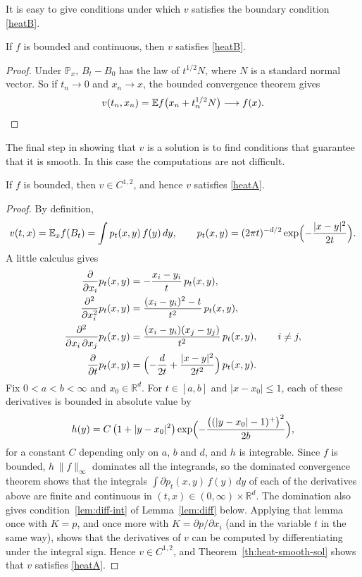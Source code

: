It is easy to give conditions under which $v$ satisfies the boundary condition
\ref{heatB}.

\begin{theorem}\label{th414}
	If $f$ is bounded and continuous, then $v$ satisfies \ref{heatB}.
\end{theorem}
\begin{proof}
	Under $\mathbb{P}_x$, $B_t - B_0$ has the law of $t^{1/2}N$, where $N$ is a
	standard normal vector. So if $t_n\to0$ and $x_n\to x$, the bounded
	convergence theorem gives
	\[
		v(t_n,x_n) = \mathbb{E} f\bigl(x_n + t_n^{1/2}N\bigr) \longrightarrow f(x). \qedhere
	\]
\end{proof}

The final step in showing that $v$ is a solution is to find conditions that
guarantee that it is smooth. In this case the computations are not difficult.

\begin{theorem}\label{th415}
	If $f$ is bounded, then $v\in C^{1,2}$, and hence $v$ satisfies \ref{heatA}.
\end{theorem}
\begin{proof}
	By definition,
	\[
		v(t,x) = \mathbb{E}_x f(B_t) = \int p_t(x,y)\,f(y)\,dy,
		\qquad
		p_t(x,y) = (2\pi t)^{-d/2}\exp\Bigl(-\frac{|x-y|^2}{2t}\Bigr).
	\]
	A little calculus gives
	\begin{align*}
		\frac{\partial}{\partial x_i}p_t(x,y)                    & = -\frac{x_i-y_i}{t}\,p_t(x,y),                                \\
		\frac{\partial^2}{\partial x_i^2}p_t(x,y)                & = \frac{(x_i-y_i)^2-t}{t^2}\,p_t(x,y),                         \\
		\frac{\partial^2}{\partial x_i\,\partial x_j}p_t(x,y)    & = \frac{(x_i-y_i)(x_j-y_j)}{t^2}\,p_t(x,y), \qquad i\neq j,    \\
		\frac{\partial}{\partial t}p_t(x,y)                      & = \Bigl(-\frac{d}{2t} + \frac{|x-y|^2}{2t^2}\Bigr)\,p_t(x,y).
	\end{align*}
	Fix $0<a<b<\infty$ and $x_0\in\mathbb{R}^d$. For $t\in[a,b]$ and
	$|x-x_0|\leqslant1$, each of these derivatives is bounded in absolute value
	by
	\[
		h(y) = C\,\bigl(1+|y-x_0|^2\bigr)\exp\Bigl(-\frac{\bigl((|y-x_0|-1)^+\bigr)^2}{2b}\Bigr),
	\]
	for a constant $C$ depending only on $a$, $b$ and $d$, and $h$ is integrable.
	Since $f$ is bounded, $h\,\|f\|_\infty$ dominates all the integrands, so
	the dominated convergence theorem shows that the integrals
	$\int \partial p_t(x,y)\,f(y)\,dy$ of each of the derivatives above are finite
	and continuous in $(t,x)\in(0,\infty)\times\mathbb{R}^d$. The domination
	also gives condition~\ref{lem:diff-int} of Lemma~\ref{lem:diff} below. Applying
	that lemma once with $K = p$, and once more with $K = \partial p/\partial x_i$
	(and in the variable $t$ in the same way), shows that the derivatives of $v$
	can be computed by differentiating under the integral sign. Hence
	$v\in C^{1,2}$, and Theorem~\ref{th:heat-smooth-sol} shows that $v$
	satisfies \ref{heatA}.
\end{proof}

